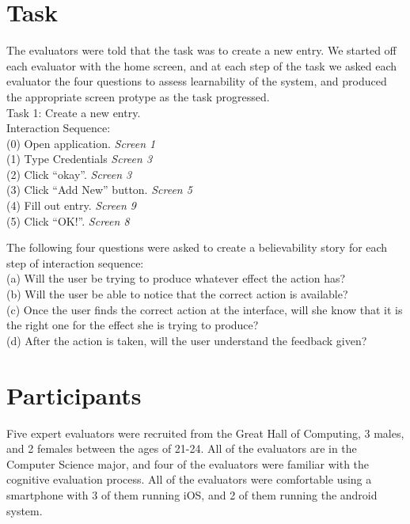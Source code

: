 \documentclass[pdftex,12pt,a4paper]{report}
\begin{document}
\section{Task}

The evaluators were told that the task was to create a new entry. We started off each evaluator with the home screen, and at each step of the task we asked each evaluator the four questions to assess learnability of the system, and produced the appropriate screen protype as the task progressed. 
\vspace{0.7cm}
\\Task 1: Create a new entry. 
\\Interaction Sequence:
\vspace{0.3cm}
 \\(0) Open application.  \textit{Screen 1}
 \\(1) Type Credentials \textit{Screen 3}
 \\(2) Click ``okay''.  \textit{Screen 3}
 \\(3) Click ``Add New'' button.  \textit{Screen 5}
 \\(4) Fill out entry.  \textit{Screen 9}
 \\(5) Click ``OK!''.  \textit{Screen 8}
\vspace{0.7cm}

The following four questions were asked to create a believability story for each step of interaction sequence:
\vspace{0.7cm}
\\(a) Will the user be trying to produce whatever effect the action has?
\\(b) Will the user be able to notice that the correct action is available?
\\(c) Once the user finds the correct action at the interface, will she know that it is the right one for the effect she is trying to produce?
\\(d) After the action is taken, will the user understand the feedback given?

\section{Participants}
Five expert evaluators were recruited from the Great Hall of Computing, 3 males, and 2 females between the ages of 21-24. All of the evaluators are in the Computer Science major, and four of the evaluators were familiar with the cognitive evaluation process. All of the evaluators were comfortable using a smartphone with 3 of them running iOS, and 2 of them running the android system.
\end{document}
